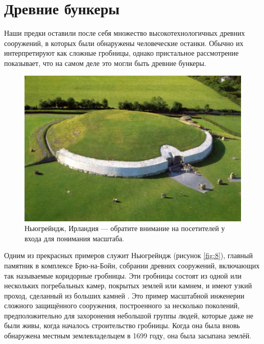 \documentclass[10pt,twocolumn,letterpaper]{article}
\begin{document}
\section{Древние бункеры}

Наши предки оставили после себя множество высокотехнологичных древних сооружений, в которых были обнаружены человеческие останки. Обычно их интерпретируют как сложные гробницы, однако пристальное рассмотрение показывает, что на самом деле это могли быть древние бункеры.

\begin{figure}[b]
\begin{center}

   \includegraphics[width=1\linewidth]{ww19.jpg}
\end{center}
   \caption{Ньюгрейндж, Ирландия — обратите внимание на посетителей у входа для понимания масштаба.}
\label{fig:8}
\label{fig:onecol}
\end{figure}

Одним из прекрасных примеров служит Ньюгрейндж (рисунок \ref{fig:8}), главный памятник в комплексе Брю-на-Бойн, собрании древних сооружений, включающих так называемые коридорные гробницы. Эти гробницы состоят из одной или нескольких погребальных камер, покрытых землей или камнем, и имеют узкий проход, сделанный из больших камней \cite{70}. Это пример масштабной инженерии сложного защищённого сооружения, построенного за несколько поколений, предположительно для захоронения небольшой группы людей, которые даже не были живы, когда началось строительство гробницы. Когда она была вновь обнаружена местным землевладельцем в 1699 году, она была засыпана землёй.
\end{document}
